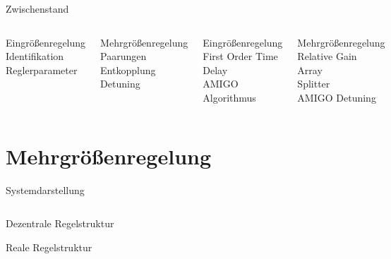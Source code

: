 \documentclass[fleqn,11pt,aspectratio=43]{beamer}
\begin{document}
\begin{frame}{Zwischenstand}

\begin{columns}[onlytextwidth]
\begin{alertblock}{Eingrößenregelung \Huge{\checkmark}}
Identifikation \\
Reglerparameter
\end{alertblock}


\begin{alertblock}{Mehrgrößenregelung}
Paarungen \\
Entkopplung \\
Detuning
\end{alertblock}

\begin{exampleblock}{Eingrößenregelung \Huge{\checkmark}}
First Order Time Delay \\
AMIGO Algorithmus
\end{exampleblock}

\begin{exampleblock}{Mehrgrößenregelung}
Relative Gain Array \\
Splitter \\
AMIGO Detuning
\end{exampleblock}

\end{columns}
\end{frame}

\section{Mehrgrößenregelung}

\begin{frame}{Systemdarstellung}
\begin{columns}[onlytextwidth]
	\centering \resizebox{\textwidth}{!}{}
	\centering \resizebox{\textwidth}{!}{}
\end{columns}
\end{frame}

\begin{frame}{Dezentrale Regelstruktur}
\begin{figure}\center

\end{figure}
\end{frame}

\begin{frame}{Reale Regelstruktur}

\end{frame}
\end{document}
